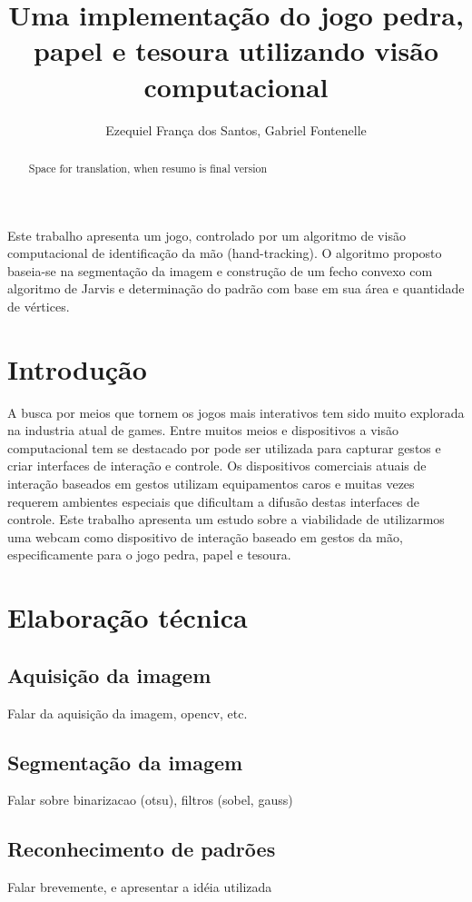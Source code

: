 \documentclass[12pt]{article}
\title{Uma implementação do jogo pedra, papel e tesoura utilizando visão computacional}
\author{Ezequiel França dos Santos\inst{1}, Gabriel Fontenelle\inst{1}}
\begin{document}
 
\maketitle

\begin{abstract}
Space for translation, when resumo is final version %
\end{abstract}
     
\begin{resumo} 
Este trabalho apresenta um jogo, controlado por um algoritmo de visão computacional de identificação da mão (hand-tracking). O algoritmo proposto baseia-se na segmentação da imagem e construção de um fecho convexo com algoritmo de Jarvis e determinação do padrão com base em sua área e quantidade de vértices.
\end{resumo}


\section{Introdução}

A busca por meios que tornem os jogos mais interativos tem sido muito explorada na industria atual de games. Entre muitos meios e dispositivos a visão computacional tem se destacado por pode ser utilizada para capturar gestos e criar interfaces de interação e controle. Os dispositivos comerciais atuais de interação baseados em gestos utilizam equipamentos caros e
muitas vezes requerem ambientes especiais que dificultam a difusão destas interfaces de controle.
Este trabalho apresenta um estudo sobre a viabilidade de utilizarmos uma webcam como dispositivo de interação baseado em gestos da mão, especificamente para o jogo pedra, papel e tesoura.

\section{Elaboração técnica}
\subsection{Aquisição da imagem}
Falar da aquisição da imagem, opencv, etc.

\subsection{Segmentação da imagem}
Falar sobre binarizacao (otsu), filtros (sobel, gauss)

\subsection{Reconhecimento de padrões}
Falar brevemente, e apresentar a idéia utilizada
\end{document}
